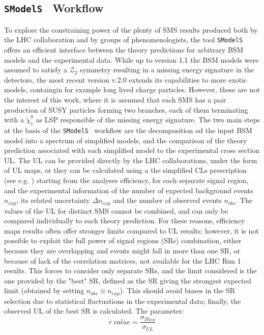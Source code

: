 \documentclass[a4paper,11pt]{article}
\newcommand{\SMO}{\texttt{SModelS\xspace}}
\begin{document}
\subsection{\SMO~ Workflow}\label{smo}
To explore the constraining power of the plenty of SMS results produced both by the LHC collaboration and by groups of phenomenologists, the tool \SMO\cite{Kraml:2013mwa,Ambrogi:2017neo,Ambrogi:2018ujg} offers an efficient interface between the theory predictions for arbitrary BSM models and the experimental data. While up to version 1.1 the BSM models were assumed to satisfy a $\mathcal{Z_2}$ symmetry resulting in a missing energy signature in the detectors, the most recent version v.2.0 extends its capabilities to more exotic models, containgin for example long lived charge particles. However, these are not the interest of this work, where it is assumed that each SMS has a pair production of SUSY particles forming two branches, each of them terminating with a $ \tilde \chi_1 ^0$ as LSP responsible of the missing energy signature.
%
The two main steps at the basis of the \SMO~ workflow are the decomposition od the input BSM model into a spectrum of simplified models, and the comparison of the theory prediction associated with each simplified model to the experimental cross section UL. The UL can be provided directly by the LHC collaborations, under the form of UL maps, or they can be calculated using a the simplified CLs prescription (see e.g. \cite{Read:2002hq,Junk:1999kv}) starting from the analyses efficiency, for each separate signal region, and the experimental information of the number of expected background events $n_{exp}$, its related uncertainty $\Delta n_{exp}$ and the number of observed events $n_{obs}$. The values of the UL for distinct SMS cannot be combined, and can only be compared individually to each theory prediction. For these reasons, efficiency maps results often offer stronger limits compared to UL results; however, it is not possible to exploit the full power of signal regions (SRs) combination, either because they are overlapping and events might fall in more than one SR, or because of lack of the correlation matrices, not available for the LHC Run 1 results. This forces to consider only separate SRs, and the limit considered is the one provided by the "best" SR, defined as the SR giving the strongest expected limit (obtained by setting $n_{obs}\equiv n_{exp}$). This should avoid biases in the SR selection due to statistical fluctuations in the experimental data; finally, the observed UL of the best SR is calculated. The parameter:
\begin{equation}\label{rvalue}
r \ value = \frac{\sigma_{Theo}}{\sigma_{UL}}
\end{equation}
\end{document}

